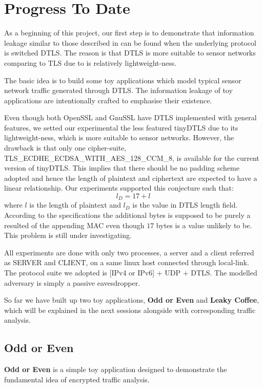 \chapter{Progress To Date}
\label{Chp: Progress To Date}

As a beginning of this project, our first step is to demonstrate that information leakage similar to those described in \cite{Web1} can be found when the underlying protocol is switched DTLS. The reason is that DTLS is more suitable to sensor networks comparing to TLS due to is relatively lightweight-ness. 

The basic idea is to build some toy applications which model typical sensor network traffic generated through DTLS. The information leakage of toy applications are intentionally crafted to emphasise their existence.

Even though both OpenSSL and GnuSSL have DTLS implemented with general features, we setted our experimental the less featured tinyDTLS\cite{tinyDTLS} due to its lightweight-ness, which is more suitable to sensor networks. However, the drawback is that only one cipher-suite, TLS\_ECDHE\_ECDSA\_WITH\_AES\_128\_CCM\_8\cite{rfc7251}, is available for the current version of tinyDTLS. This implies that there should be no padding scheme adopted and hence the length of plaintext and ciphertext are expected to have a linear relationship. Our experiments supported this conjecture such that:
\begin{equation} \label{Eq: Plaintext length}
l_D = 17 + l
\end{equation}
where $l$ is the length of plaintext and $l_D$ is the value in DTLS length field. According to the specifications the additional bytes is supposed to be purely a resulted of the appending MAC even though $17$ bytes is a value unlikely to be. This problem is still under investigating.

All experiments are done with only two processes, a server and a client referred as SERVER and CLIENT, on a same linux host connected through local-link. The protocol suite we adopted is [IPv4 or IPv6] + UDP + DTLS. The modelled adversary is simply a passive eavesdropper.

So far we have built up two toy applications, \textbf{Odd or Even} and \textbf{Leaky Coffee}, which will be explained in the next sessions alongside with corresponding traffic analysis.

\section{Odd or Even} \label{Sec: Odd or Even}
\textbf{Odd or Even} is a simple toy application designed  to demonstrate the fundamental idea of encrypted traffic analysis.

